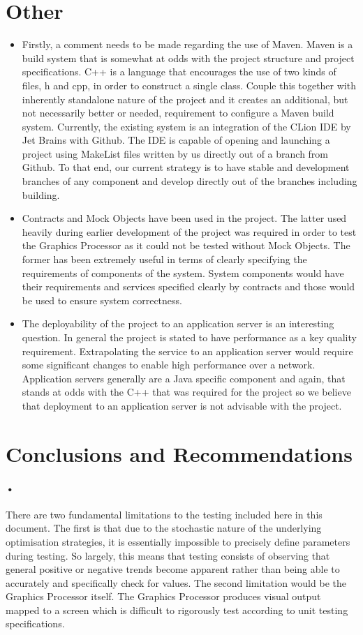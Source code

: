 \documentclass[11pt]{article}
\begin{document}
\section{Other}
\begin{itemize}
\item Firstly, a comment needs to be made regarding the use of Maven. Maven is a build system that is somewhat at odds with the project structure and project specifications. C++ is a language that encourages the use of two kinds of files, h and cpp, in order to construct a single class. Couple this together with inherently standalone nature of the project and it creates an additional, but not necessarily better or needed, requirement to configure a Maven build system. Currently, the existing system is an integration of the CLion IDE by Jet Brains with Github. The IDE is capable of opening and launching a project using MakeList files written by us directly out of a branch from Github. To that end, our current strategy is to have stable and development branches of any component and develop directly out of the branches including building.
\item Contracts and Mock Objects have been used in the project. The latter used heavily during earlier development of the project was required in order to test the Graphics Processor as it could not be tested without Mock Objects. The former has been extremely useful in terms of clearly specifying the requirements of components of the system. System components would have their requirements and services specified clearly by contracts and those would be used to ensure system correctness.
\item The deployability of the project to an application server is an interesting question. In general the project is stated to have performance as a key quality requirement. Extrapolating the service to an application server would require some significant changes to enable high performance over a network. Application servers generally are a Java specific component and again, that stands at odds with the C++ that was required for the project so we believe that deployment to an application server is not advisable with the project.
\end{itemize}
\section{Conclusions and Recommendations}
\paragraph{•}
There are two fundamental limitations to the testing included here in this document. The first is that due to the stochastic nature of the underlying optimisation strategies, it is essentially impossible to precisely define parameters during testing. So largely, this means that testing consists of observing that general positive or negative trends become apparent rather than being able to accurately and specifically check for values. The second limitation would be the Graphics Processor itself. The Graphics Processor produces visual output mapped to a screen which is difficult to rigorously test according to unit testing specifications. 
\end{document}
